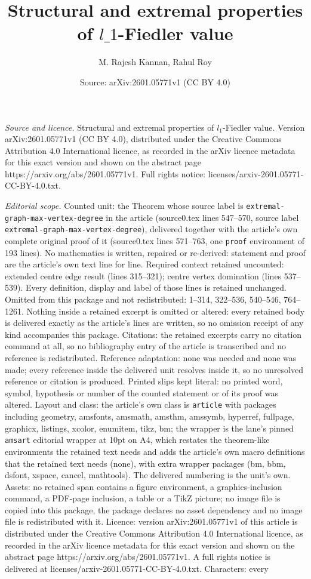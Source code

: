 \documentclass[10pt,a4paper]{amsart}
\title[Structural and extremal properties of $l\_1$-Fiedler value]{Structural and extremal properties of $l\_1$-Fiedler value}
\author{M. Rajesh Kannan, Rahul Roy}
\date{Source: arXiv:2601.05771v1 (CC BY 4.0)}
\begin{document}
\maketitle

\noindent\emph{Source and licence.} Structural and extremal properties of $l_1$-Fiedler value. Version arXiv:2601.05771v1 (CC BY 4.0), distributed under the Creative Commons Attribution 4.0 International licence, as recorded in the arXiv licence metadata for this exact version and shown on the abstract page https://arxiv.org/abs/2601.05771v1. Full rights notice: licenses/arxiv-2601.05771-CC-BY-4.0.txt.\par\smallskip

\noindent\textit{Editorial scope.} Counted unit: the Theorem whose source label is \texttt{extremal-graph-max-vertex-degree} in the article (source0.tex lines 547--570, source label \texttt{extremal-graph-max-vertex-degree}), delivered together with the article's own complete original proof of it (source0.tex lines 571--763, one \texttt{proof} environment of 193 lines). No mathematics is written, repaired or re-derived: statement and proof are the article's own text line for line. Required context retained uncounted: extended centre edge result (lines 315--321); centre vertex domination (lines 537--539). Every definition, display and label of those lines is retained unchanged. Omitted from this package and not redistributed: 1--314, 322--536, 540--546, 764--1261. Nothing inside a retained excerpt is omitted or altered: every retained body is delivered exactly as the article's lines are written, so no omission receipt of any kind accompanies this package. Citations: the retained excerpts carry no citation command at all, so no bibliography entry of the article is transcribed and no reference is redistributed. Reference adaptation: none was needed and none was made; every reference inside the delivered unit resolves inside it, so no unresolved reference or citation is produced. Printed slips kept literal: no printed word, symbol, hypothesis or number of the counted statement or of its proof was altered. Layout and class: the article's own class is \texttt{article} with packages including geometry, amsfonts, amsmath, amsthm, amssymb, hyperref, fullpage, graphicx, listings, xcolor, enumitem, tikz, bm; the wrapper is the lane's pinned \texttt{amsart} editorial wrapper at 10pt on A4, which restates the theorem-like environments the retained text needs and adds the article's own macro definitions that the retained text needs (none), with extra wrapper packages (bm, bbm, dsfont, xspace, cancel, mathtools). The delivered numbering is the unit's own. Assets: no retained span contains a figure environment, a graphics-inclusion command, a PDF-page inclusion, a table or a TikZ picture; no image file is copied into this package, the package declares no asset dependency and no image file is redistributed with it. Licence: version arXiv:2601.05771v1 of this article is distributed under the Creative Commons Attribution 4.0 International licence, as recorded in the arXiv licence metadata for this exact version and shown on the abstract page https://arxiv.org/abs/2601.05771v1. A full rights notice is delivered at licenses/arxiv-2601.05771-CC-BY-4.0.txt. Characters: every 
\end{document}
